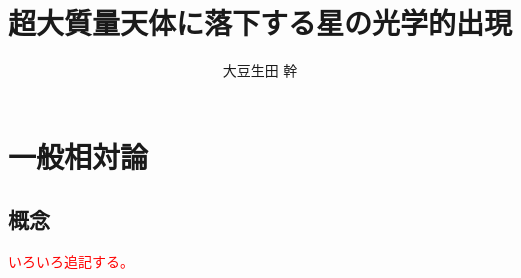 \documentclass[dvipdfmx]{report} %
\title{超大質量天体に落下する星の光学的出現}
\author{大豆生田 幹}
\date{}
\begin{document}
\maketitle %
\tableofcontents %
\fontsize{11pt}{11pt}\selectfont %

\chapter{一般相対論}


\section{概念}
\textcolor{red}{いろいろ追記する。}

\end{document}
